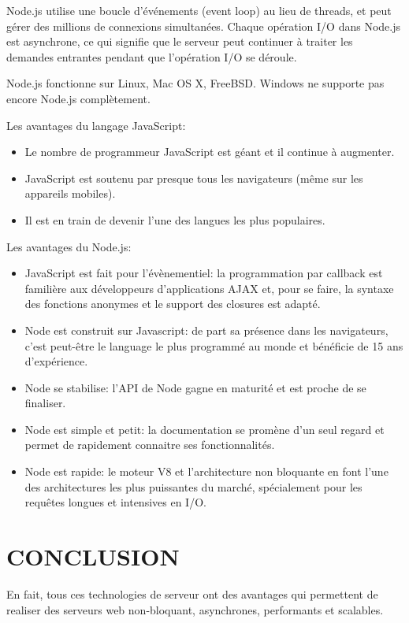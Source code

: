 \documentclass[a4paper,10pt]{report}
\begin{document}
Node.js utilise une boucle d'événements (event loop) au lieu de threads, et peut gérer des millions de connexions simultanées. Chaque opération I/O dans Node.js est asynchrone, ce qui signifie que le serveur peut continuer à traiter les demandes entrantes pendant que l’opération I/O se déroule.


Node.js fonctionne sur Linux, Mac OS X, FreeBSD. Windows ne supporte pas encore Node.js complètement.


Les avantages du langage JavaScript:
\begin{itemize}
 \item Le nombre de programmeur JavaScript est géant et il continue à augmenter.
 \item JavaScript est soutenu par presque tous les navigateurs (même sur les appareils mobiles).
 \item Il est en train de devenir l'une des langues les plus populaires.
\end{itemize}


Les avantages du Node.js:
\begin{itemize}
 \item JavaScript est fait pour l'évènementiel: la programmation par callback est familière aux développeurs d'applications AJAX et, pour se faire, la syntaxe des fonctions anonymes et le support des closures est adapté.
 \item Node est construit sur Javascript: de part sa présence dans les navigateurs, c'est peut-être le language le plus programmé au monde et bénéficie de 15 ans d'expérience.
 \item Node se stabilise: l'API de Node gagne en maturité et est proche de se finaliser.
 \item Node est simple et petit: la documentation se promène d'un seul regard et permet de rapidement connaitre ses fonctionnalités.
 \item Node est rapide: le moteur V8 et l'architecture non bloquante en font l'une des architectures les plus puissantes du marché, spécialement pour les requêtes longues et intensives en I/O. 
\end{itemize}

  \section{CONCLUSION}
En fait, tous ces technologies de serveur ont des avantages qui permettent de realiser des serveurs web non-bloquant, asynchrones, performants et scalables. 
\end{document}
